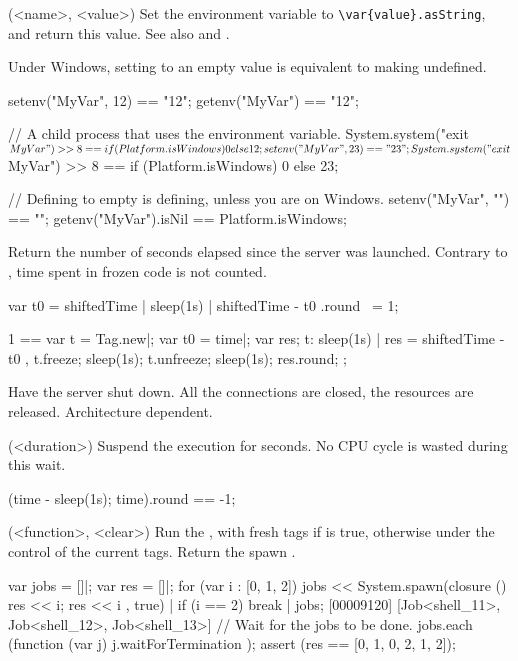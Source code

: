 \begin{urbiscriptapi}
\item[setenv](<name>, <value>)%
  Set the environment variable  to
  \lstinline|\var{value}.asString|, and return this value.  See also
   and .
  \begin{windows}
    Under Windows, setting to an empty value is equivalent to
    making undefined.
  \end{windows}

\begin{urbiassert}
setenv("MyVar", 12) == "12";
getenv("MyVar") == "12";

// A child process that uses the environment variable.
System.system("exit $MyVar") >> 8 ==
       {if (Platform.isWindows) 0 else 12};
setenv("MyVar", 23) == "23";
System.system("exit $MyVar") >> 8 ==
       {if (Platform.isWindows) 0 else 23};

// Defining to empty is defining, unless you are on Windows.
setenv("MyVar", "") == "";
getenv("MyVar").isNil == Platform.isWindows;
\end{urbiassert}


\item[shiftedTime] Return the number of seconds elapsed since the
  \urbi server was launched.  Contrary to ,
  time spent in frozen code is not counted.
\begin{urbiassert}
{ var t0 = shiftedTime | sleep(1s) | shiftedTime - t0 }.round ~= 1;

  1 ==
  {
    var t = Tag.new|;
    var t0 = time|;
    var res;
    t: { sleep(1s) | res = shiftedTime - t0 },
    t.freeze;
    sleep(1s);
    t.unfreeze;
    sleep(1s);
    res.round;
  };
\end{urbiassert}


\item[shutdown] Have the \urbi server shut down.  All the connections
  are closed, the resources are released.  Architecture dependent.


\item[sleep](<duration>)%
  Suspend the execution for  seconds.  No CPU cycle is
  wasted during this wait.

\begin{urbiassert}
(time - {sleep(1s); time}).round == -1;
\end{urbiassert}


\item[spawn](<function>, <clear>)%
  Run the , with fresh tags if  is true, otherwise
  under the control of the current tags.  Return the spawn .
\begin{urbiscript}
var jobs = []|;
var res = []|;
for (var i : [0, 1, 2])
{
  jobs << System.spawn(closure () { res << i; res << i },
                       true) |
  if (i == 2)
    break
}|
jobs;
[00009120] [Job<shell_11>, Job<shell_12>, Job<shell_13>]
// Wait for the jobs to be done.
jobs.each (function (var j) { j.waitForTermination });
assert (res == [0, 1, 0, 2, 1, 2]);
\end{urbiscript}


\end{urbiscriptapi}
